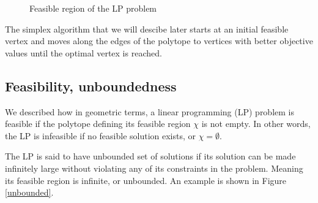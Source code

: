 \begin{figure}
    \centering
    \caption{Feasible region of the LP problem}
\end{figure}\label{fig:lp_geom}

The simplex algorithm that we will descibe later starts at an initial feasible vertex and moves along
the edges of the polytope to vertices with better objective
values until the optimal vertex is reached.


\subsection{Feasibility, unboundedness}\label{feasibility}
We described how in geometric terms, a linear programming (LP) problem is feasible if the
polytope defining its feasible region $ \chi $ is not empty.
In other words, the LP is infeasible if no feasible solution exists, or $\chi = \emptyset$.

The LP is said to have unbounded set of solutions if its
solution can be made infinitely large without violating any of its constraints in the problem.
Meaning its feasible region is infinite, or unbounded. An example is shown in Figure \ref{unbounded}.

